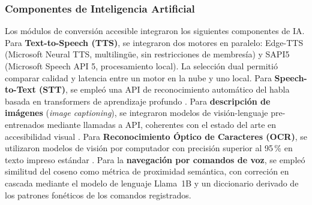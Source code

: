 \documentclass[journal]{IEEEtran}
\begin{document}
			\subsubsection{Componentes de Inteligencia Artificial}
				Los m\'odulos de conversi\'on accesible integraron los siguientes componentes de IA. Para \textbf{Text-to-Speech (TTS)}, se integraron dos motores en paralelo: Edge-TTS (Microsoft Neural TTS, multiling\"ue, sin restricciones de membres\'ia) y SAPI5 (Microsoft Speech API 5, procesamiento local). La selecci\'on dual permiti\'o comparar calidad y latencia entre un motor en la nube y uno local. Para \textbf{Speech-to-Text (STT)}, se emple\'o una API de reconocimiento autom\'atico del habla basada en transformers de aprendizaje profundo \cite{baevski2020, radford2023}. Para \textbf{descripci\'on de im\'agenes} (\textit{image captioning}), se integraron modelos de visi\'on-lenguaje pre-entrenados mediante llamadas a API, coherentes con el estado del arte en accesibilidad visual \cite{dognin2021, safiya2024}. Para \textbf{Reconocimiento \'Optico de Caracteres (OCR)}, se utilizaron modelos de visi\'on por computador con precisi\'on superior al 95\,\% en texto impreso est\'andar \cite{mukherjee2023}. Para la \textbf{navegaci\'on por comandos de voz}, se emple\'o similitud del coseno \cite{lahitani2016} como m\'etrica de proximidad sem\'antica, con correci\'on en cascada mediante el modelo de lenguaje Llama~1B y un diccionario derivado de los patrones fon\'eticos de los comandos registrados.
				
\end{document}
